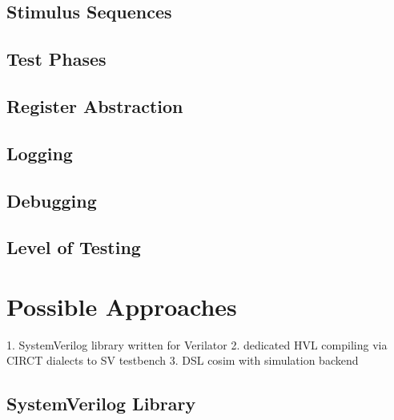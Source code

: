\documentclass[12pt]{report}
\begin{document}
\subsection{Stimulus Sequences} %

\subsection{Test Phases} %

\subsection{Register Abstraction} %

\subsection{Logging} %

\subsection{Debugging} %

\subsection{Level of Testing} %

\section{Possible Approaches} %

1. SystemVerilog library written for Verilator
2. dedicated HVL compiling via CIRCT dialects to SV testbench
3. DSL cosim with simulation backend

\subsection{SystemVerilog Library} %
\end{document}
